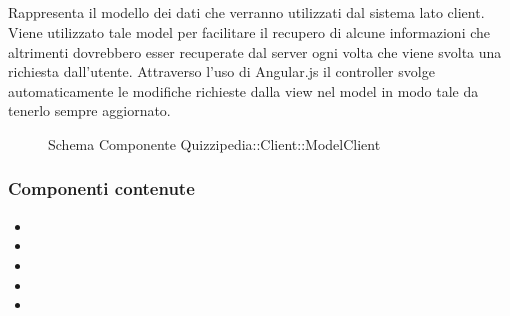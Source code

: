 \subsection{}
Rappresenta il modello dei dati che verranno utilizzati dal sistema lato client. Viene utilizzato tale model per facilitare il recupero di alcune informazioni che altrimenti dovrebbero esser recuperate dal server ogni volta che viene svolta una richiesta dall'utente.
Attraverso l'uso di Angular.js il controller svolge automaticamente le modifiche richieste dalla view nel model in modo tale da tenerlo sempre aggiornato.
\begin{figure}[H]
\centering
\noindent{}
\caption[Schema Componente Quizzipedia::Client::ModelClient]{Schema Componente Quizzipedia::Client::ModelClient}
\end{figure}
\subsubsection{Componenti contenute}
\begin{itemize}
\item {}
\item {}
\item {}
\item {}
\item {}
\end{itemize}
